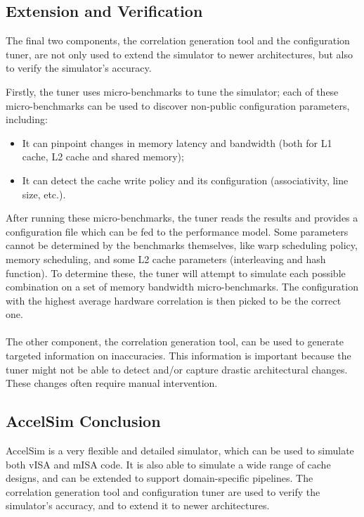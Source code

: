\subsection{Extension and Verification}\label{subsec:extension-and-verification}
The final two components, the correlation generation tool and the configuration tuner, are not only used to extend the simulator to newer architectures, but also to verify the simulator's accuracy.

Firstly, the tuner uses micro-benchmarks to tune the simulator; each of these micro-benchmarks can be used to discover non-public configuration parameters, including:
\begin{itemize}
    \item It can pinpoint changes in memory latency and bandwidth (both for L1 cache, L2 cache and shared memory);
    \item It can detect the cache write policy and its configuration (associativity, line size, etc.).
\end{itemize}

After running these micro-benchmarks, the tuner reads the results and provides a configuration file which can be fed to the performance model.
Some parameters cannot be determined by the benchmarks themselves, like warp scheduling policy, memory scheduling, and some L2 cache parameters (interleaving and hash function).
To determine these, the tuner will attempt to simulate each possible combination on a set of memory bandwidth micro-benchmarks.
The configuration with the highest average hardware correlation is then picked to be the correct one.
\\
\\
The other component, the correlation generation tool, can be used to generate targeted information on inaccuracies.
This information is important because the tuner might not be able to detect and/or capture drastic architectural changes.
These changes often require manual intervention.

\subsection{AccelSim Conclusion}\label{subsec:accelsim-conclusion}
AccelSim is a very flexible and detailed simulator, which can be used to simulate both vISA and mISA code.
It is also able to simulate a wide range of cache designs, and can be extended to support domain-specific pipelines.
The correlation generation tool and configuration tuner are used to verify the simulator's accuracy, and to extend it to newer architectures.

